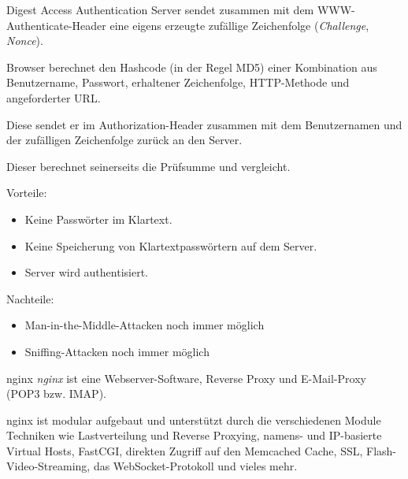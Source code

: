 \begin{defi}{Digest Access Authentication}
    Server sendet zusammen mit dem WWW-Authenticate-Header eine eigens erzeugte zufällige Zeichenfolge (\emph{Challenge}, \emph{Nonce}).

    Browser berechnet den Hashcode (in der Regel MD5) einer Kombination aus Benutzername, Passwort, erhaltener Zeichenfolge, HTTP-Methode und angeforderter URL.

    Diese sendet er im Authorization-Header zusammen mit dem Benutzernamen und der zufälligen Zeichenfolge zurück an den Server.

    Dieser berechnet seinerseits die Prüfsumme und vergleicht.

    Vorteile:
    \begin{itemize}
        \item Keine Passwörter im Klartext.
        \item Keine Speicherung von Klartextpasswörtern auf dem Server.
        \item Server wird authentisiert.
    \end{itemize}

    Nachteile:
    \begin{itemize}
        \item Man-in-the-Middle-Attacken noch immer möglich
        \item Sniffing-Attacken noch immer möglich
    \end{itemize}
\end{defi}

\begin{bonus}{nginx}
    \emph{nginx} ist eine Webserver-Software, Reverse Proxy und E-Mail-Proxy (POP3 bzw. IMAP).

    nginx ist modular aufgebaut und unterstützt durch die verschiedenen Module Techniken wie Lastverteilung und Reverse Proxying, namens- und IP-basierte Virtual Hosts, FastCGI, direkten Zugriff auf den Memcached Cache, SSL, Flash-Video-Streaming, das WebSocket-Protokoll und vieles mehr.
\end{bonus}